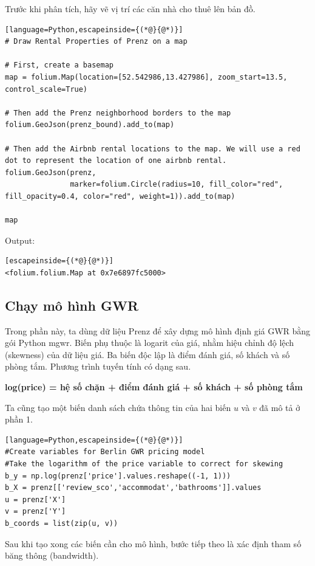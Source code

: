 Trước khi phân tích, hãy vẽ vị trí các căn nhà cho thuê lên bản đồ.

\begin{lstlisting}[language=Python,escapeinside={(*@}{@*)}]
# Draw Rental Properties of Prenz on a map

# First, create a basemap
map = folium.Map(location=[52.542986,13.427986], zoom_start=13.5, control_scale=True)

# Then add the Prenz neighborhood borders to the map
folium.GeoJson(prenz_bound).add_to(map)

# Then add the Airbnb rental locations to the map. We will use a red dot to represent the location of one airbnb rental.
folium.GeoJson(prenz,
               marker=folium.Circle(radius=10, fill_color="red", fill_opacity=0.4, color="red", weight=1)).add_to(map)

map
\end{lstlisting}

Output:

\begin{lstlisting}[escapeinside={(*@}{@*)}]
<folium.folium.Map at 0x7e6897fc5000>
\end{lstlisting}

\subsection{Chạy mô hình GWR}

Trong phần này, ta dùng dữ liệu Prenz để xây dựng mô hình định giá GWR bằng gói Python mgwr. Biến phụ thuộc là logarit của giá, nhằm hiệu chỉnh độ lệch (skewness) của dữ liệu giá. Ba biến độc lập là điểm đánh giá, số khách và số phòng tắm. Phương trình tuyến tính có dạng sau.

\textbf{log(price) = hệ số chặn + điểm đánh giá + số khách + số phòng tắm}

Ta cũng tạo một biến danh sách chứa thông tin của hai biến \(u\) và \(v\) đã mô tả ở phần 1.

\begin{lstlisting}[language=Python,escapeinside={(*@}{@*)}]
#Create variables for Berlin GWR pricing model
#Take the logarithm of the price variable to correct for skewing
b_y = np.log(prenz['price'].values.reshape((-1, 1)))
b_X = prenz[['review_sco','accommodat','bathrooms']].values
u = prenz['X']
v = prenz['Y']
b_coords = list(zip(u, v))
\end{lstlisting}

Sau khi tạo xong các biến cần cho mô hình, bước tiếp theo là xác định tham số băng thông (bandwidth).

